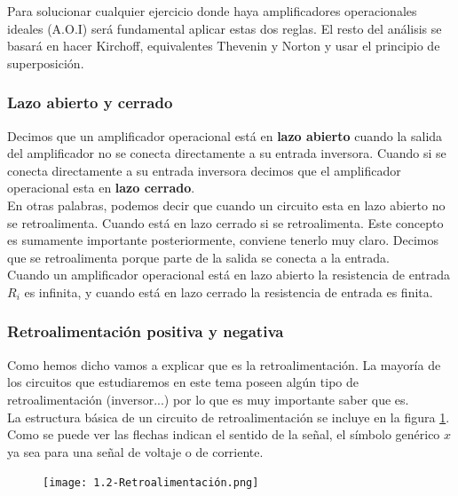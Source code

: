 \documentclass[11pt]{article} %
\begin{document}
Para solucionar cualquier ejercicio donde haya amplificadores operacionales ideales (A.O.I) será fundamental aplicar estas dos reglas. El resto del análisis se basará en hacer Kirchoff, equivalentes Thevenin y Norton y usar el principio de superposición.



\subsubsection{Lazo abierto y cerrado}

Decimos 	que un amplificador operacional está en \textbf{lazo abierto} cuando la salida del amplificador no se conecta directamente a su entrada inversora. Cuando si se conecta directamente a su entrada inversora decimos que el amplificador operacional esta en \textbf{lazo cerrado}. \\

En otras palabras, podemos decir que cuando un circuito esta en
 lazo abierto no se retroalimenta. Cuando está en lazo cerrado si se retroalimenta. Este concepto es sumamente importante posteriormente, conviene tenerlo muy claro. Decimos que se retroalimenta porque parte de la salida se conecta a la entrada. \\
  
 
Cuando un amplificador operacional está en lazo abierto la resistencia de entrada $R_i$ es infinita, y cuando está en lazo cerrado la resistencia de entrada es finita. 

\subsubsection{Retroalimentación positiva y negativa}


Como hemos dicho vamos a explicar que es la retroalimentación. La mayoría de los circuitos que estudiaremos en este tema poseen algún  tipo de retroalimentación (inversor...) por lo que es muy importante saber que es. \\

La estructura básica de un circuito de retroalimentación se incluye en la figura \ref{Fig:1.2.3-Retroalimentacion}. Como se puede ver las flechas indican el sentido de la señal, el símbolo genérico $x$ ya sea para una señal de voltaje o de corriente. 



\begin{figure}[h!] \centering
\texttt{[image: 1.2-Retroalimentación.png]}
\caption{}
\label{Fig:1.2.3-Retroalimentacion}
\end{figure}
\end{document}
